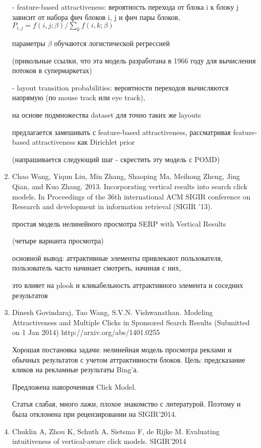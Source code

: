 \documentclass[12pt,a4paper]{article}
\begin{document}
\begin{enumerate}
        - feature-based attractiveness: вероятность перехода от блока i к блоку j зависит от набора фич блоков i, j и фич пары блоков,
	  $P_{i,j} = f(i,j; \beta) / \sum_k f(i,k; \beta)$

	  параметры $\beta$ обучаются логистической регрессией

	  (прикольные ссылки, что эта модель разработана в 1966 году для вычисления потоков в супермаркетах)

	- layout transition probabilities: вероятности переходов вычисляются напрямую (по mouse track или eye track),

	  на основе подмножества dataset для точно таких же layouts

	  предлагается замешивать с feature-based attractiveness, рассматривая feature-based attractiveness как Dirichlet prior

  (напрашивается следующий шаг - скрестить эту модель с POMD)

\item Chao Wang, Yiqun Liu, Min Zhang, Shaoping Ma, Meihong Zheng, Jing Qian, and Kuo Zhang. 2013. Incorporating vertical results into search click models. In Proceedings of the 36th international ACM SIGIR conference on Research and development in information retrieval (SIGIR '13).

  простая модель нелинейного просмотра SERP with Vertical Results

  (четыре варианта просмотра)

  основной вывод: аттрактивные элементы привлекают пользователя, пользователь часто начинает смотреть, начиная с них,

  это влияет на plook и кликабельность аттрактивного элемента и соседних результатов

\item Dinesh Govindaraj, Tao Wang, S.V.N. Vishwanathan.
Modeling Attractiveness and Multiple Clicks in Sponsored Search Results
(Submitted on 1 Jan 2014)
http://arxiv.org/abs/1401.0255

 Хорошая постановка задачи: нелинейная модель просмотра реклами и обычных результатов с учетом аттрактивности блоков. Цель: предсказание кликов на рекламные результаты Bing'а.

 Предложена навороченная Click Model.

 Статья слабая, много лажи, плохое знакомство с литературой. Поэтому и была отклонена при рецензировании на SIGIR'2014.

\item Chuklin A, Zhou K, Schuth A, Sietsma F, de Rijke M. Evaluating intuitiveness of vertical-aware click models. SIGIR'2014


\end{enumerate}
\end{document}
